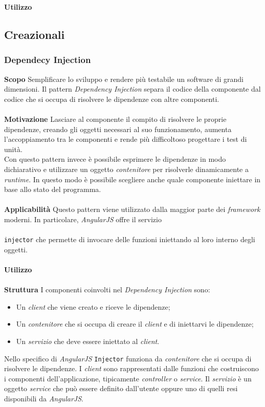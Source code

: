 \textbf{Utilizzo}

\subsection{Creazionali}
\subsubsection{Dependecy Injection}
\textbf{Scopo}	Semplificare lo sviluppo e rendere più testabile un software di grandi dimensioni. Il pattern \textit{Dependency Injection} separa il codice della componente dal codice che si occupa di risolvere le dipendenze con altre componenti.
\\\\
\textbf{Motivazione}	Lasciare al componente il compito di risolvere le proprie dipendenze, creando gli oggetti necessari al suo funzionamento, aumenta l'accoppiamento tra le componenti e rende più difficoltoso progettare i test di unità.
\\ Con questo pattern invece è possibile esprimere le dipendenze in modo dichiarativo e utilizzare un oggetto \textit{contenitore} per risolverle dinamicamente a \textit{runtime}. In questo modo è possibile scegliere anche quale componente iniettare in base allo stato del programma.
\\\\
\textbf{Applicabilità}	Questo pattern viene utilizzato dalla maggior parte dei \textit{framework} moderni. In particolare, \textit{AngularJS} offre il servizio
\\\\
\texttt{injector} che permette di invocare delle funzioni iniettando al loro interno degli oggetti.
\\\\
\textbf{Utilizzo}
\\\\
\textbf{Struttura}	I componenti coinvolti nel \textit{Dependency Injection} sono:
	\begin{itemize}
		\item Un \textit{client} che viene creato e riceve le dipendenze;
		\item Un \textit{contenitore} che si occupa di creare il \textit{client} e di iniettarvi le dipendenze;
		\item Un \textit{servizio} che deve essere iniettato al \textit{client}.
	\end{itemize}
Nello specifico di \textit{AngularJS} \texttt{Injector} funziona da \textit{contenitore} che si occupa di risolvere le dipendenze. I \textit{client} sono rappresentati dalle funzioni che costruiscono i componenti dell'applicazione, tipicamente \textit{controller} o \textit{service}. Il \textit{servizio} è un oggetto \textit{service} che può essere definito dall'utente oppure uno di quelli resi disponibili da \textit{AngularJS}.
